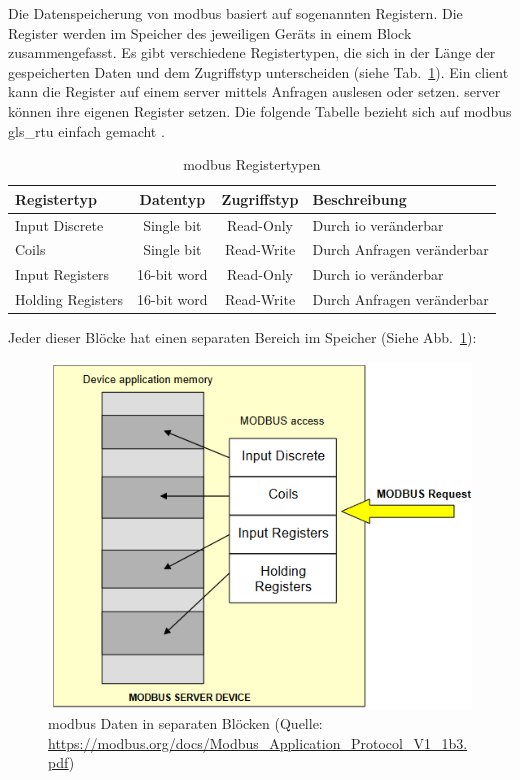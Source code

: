 Die Datenspeicherung von \gls{modbus} basiert auf sogenannten Registern. Die Register werden im Speicher des jeweiligen Geräts in einem Block zusammengefasst. Es gibt verschiedene Registertypen, die sich in der Länge der gespeicherten Daten und dem Zugriffstyp unterscheiden (siehe Tab.~\ref{tab:modbus_register}). \newline Ein \gls{client} kann die Register auf einem \gls{server} mittels Anfragen auslesen oder setzen. \gls{server} können ihre eigenen Register setzen. Die folgende Tabelle bezieht sich auf \gls{modbus} \gls{gls_rtu} einfach gemacht \cite[vgl.][]{IPC2U_GmbH:o.J.}. 
\begin{table}[H]
	\caption{\gls{modbus} Registertypen \label{tab:modbus_register}}
	\begin{tabularx}{\textwidth}{@{}l|c|c|X@{}}
		\toprule
		\textbf{Registertyp} & \textbf{Datentyp} & \textbf{Zugriffstyp} & \textbf{Beschreibung} \\
		\midrule
		Input Discrete & Single bit & Read-Only & Durch \acf{io} veränderbar \\
		Coils & Single bit & Read-Write & Durch Anfragen veränderbar \\
		Input Registers & 16-bit word & Read-Only & Durch \acs{io} veränderbar \\
		Holding Registers & 16-bit word & Read-Write & Durch Anfragen veränderbar \\
		\bottomrule
	\end{tabularx}
\end{table} 

Jeder dieser Blöcke hat einen separaten Bereich im Speicher (Siehe Abb.~\ref{fig:modbus_register_many_blocks}):
\begin{figure}[H]
	\centering
	\includegraphics[width=0.6\linewidth]{Bilder/Modbus_Data_Model_with_separate_block}
	\caption{\gls{modbus} Daten in separaten Blöcken (Quelle: \url{https://modbus.org/docs/Modbus_Application_Protocol_V1_1b3.pdf})}
	\label{fig:modbus_register_many_blocks}
\end{figure}

